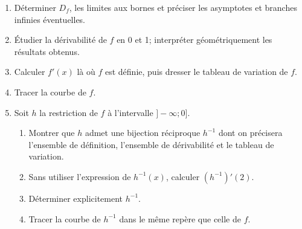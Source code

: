 \documentclass{article}
\begin{document}
\begin{enumerate}
    \item Déterminer $D_f$, les limites aux bornes et préciser les asymptotes et branches infinies éventuelles.
    \item Étudier la dérivabilité de $f$ en 0 et 1; interpréter géométriquement les résultats obtenus.
    \item Calculer $f'(x)$ là où $f$ est définie, puis dresser le tableau de variation de $f$.
    \item Tracer la courbe de $f$.
    \item Soit $h$ la restriction de $f$ à l’intervalle $]-\infty ; 0]$.
    \begin{enumerate}
        \item Montrer que $h$ admet une bijection réciproque $h^{-1}$ dont on précisera l’ensemble de définition, l’ensemble de dérivabilité et le tableau de variation.
        \item Sans utiliser l’expression de $h^{-1}(x)$, calculer $(h^{-1})'(2)$.
        \item Déterminer explicitement $h^{-1}$.
        \item Tracer la courbe de $h^{-1}$ dans le même repère que celle de $f$.
    \end{enumerate}
\end{enumerate}
\end{document}
